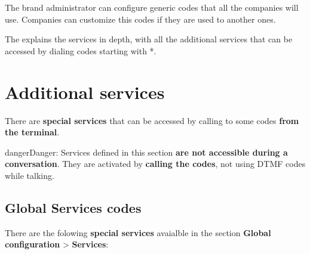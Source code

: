\documentclass[letterpaper,10pt,english]{sphinxmanual}
\begin{document}
The brand administrator can configure generic codes that all the companies will
use. Companies can customize this codes if they are used to another ones.

The {\hyperref[pbx_features/services:services]{}} explains the services in depth, with
all the additional services that can be accessed by dialing codes starting with
*.


\section{Additional services}
\label{pbx_features/services:services}\label{pbx_features/services:additional-services}\label{pbx_features/services::doc}
There are \textbf{special services} that can be accessed by calling to some codes
\textbf{from the terminal}.

\begin{notice}{danger}{Danger:}
Services defined in this section \textbf{are not accessible during a
conversation}. They are activated by \textbf{calling the codes}, not using
DTMF codes while talking.
\end{notice}


\subsection{Global Services codes}
\label{pbx_features/services:global-services-codes}
There are the folowing \textbf{special services} avaialble in the section \textbf{Global
configuration} \textgreater{} \textbf{Services}:
\end{document}
